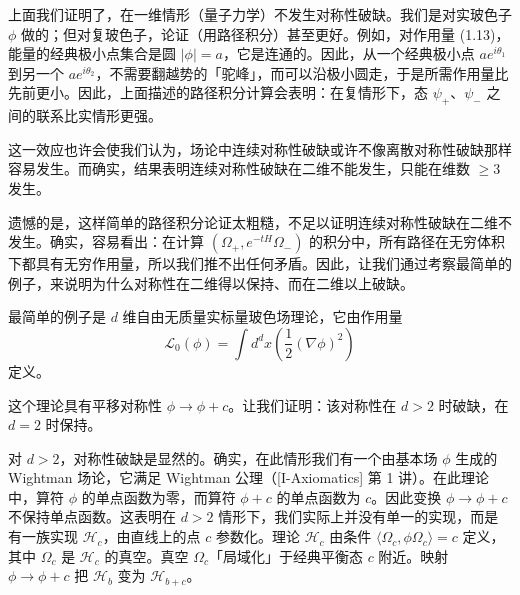 上面我们证明了，在一维情形（量子力学）不发生对称性破缺。我们是对实玻色子 $\phi$ 做的；但对复玻色子，论证（用路径积分）甚至更好。例如，对作用量 (1.13)，能量的经典极小点集合是圆 $|\phi|=a$，它是连通的。因此，从一个经典极小点 $ae^{i\theta_1}$ 到另一个 $ae^{i\theta_2}$，不需要翻越势的「驼峰」，而可以沿极小圆走，于是所需作用量比先前更小。因此，上面描述的路径积分计算会表明：在复情形下，态 $\psi_+$、$\psi_-$ 之间的联系比实情形更强。


这一效应也许会使我们认为，场论中连续对称性破缺或许不像离散对称性破缺那样容易发生。而确实，结果表明连续对称性破缺在二维不能发生，只能在维数 $\ge3$ 发生。

遗憾的是，这样简单的路径积分论证太粗糙，不足以证明连续对称性破缺在二维不发生。确实，容易看出：在计算 $(\Omega_+,e^{-tH}\Omega_-)$ 的积分中，所有路径在无穷体积下都具有无穷作用量，所以我们推不出任何矛盾。因此，让我们通过考察最简单的例子，来说明为什么对称性在二维得以保持、而在二维以上破缺。

最简单的例子是 $d$ 维自由无质量实标量玻色场理论，它由作用量
\begin{equation}
  \tag{1.14}
  \label{eq:1-14}
  \mathcal{L}_0(\phi)=\int d^dx\left(\frac12(\nabla\phi)^2\right)
\end{equation}
定义。

这个理论具有平移对称性 $\phi\to\phi+c$。让我们证明：该对称性在 $d>2$ 时破缺，在 $d=2$ 时保持。

对 $d>2$，对称性破缺是显然的。确实，在此情形我们有一个由基本场 $\phi$ 生成的 Wightman 场论，它满足 Wightman 公理（[I-Axiomatics] 第 1 讲）。在此理论中，算符 $\phi$ 的单点函数为零，而算符 $\phi+c$ 的单点函数为 $c$。因此变换 $\phi\to\phi+c$ 不保持单点函数。这表明在 $d>2$ 情形下，我们实际上并没有单一的实现，而是有一族实现 $\mathcal{H}_c$，由直线上的点 $c$ 参数化。理论 $\mathcal{H}_c$ 由条件 $\langle\Omega_c,\phi\Omega_c\rangle=c$ 定义，其中 $\Omega_c$ 是 $\mathcal{H}_c$ 的真空。真空 $\Omega_c$「局域化」于经典平衡态 $c$ 附近。映射 $\phi\to\phi+c$ 把 $\mathcal{H}_b$ 变为 $\mathcal{H}_{b+c}$。


